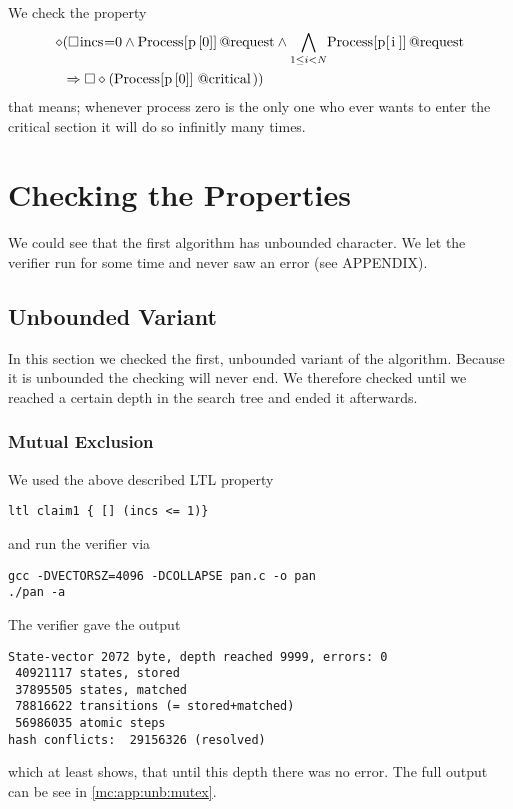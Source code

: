\documentclass{llncs}
\begin{document}
We check the property
\begin{eqnarray}
    \diamond & ( \square \text{\lstinline|incs|=0} \land \text{\lstinline|Process[p[0]]@request|} \land \underset{1\leq i < N}{\bigwedge} \text{\lstinline|Process[p[i]]@request|}\\
    &\Rightarrow \square \diamond(\text{\lstinline|Process[p[0]]@critical|}))
\end{eqnarray}
that means; whenever process zero is the only one who ever wants to enter the critical section it will do so infinitly many times.

\section{Checking the Properties}

We could see that the first algorithm has unbounded character. We let the verifier run for some time
and never saw an error (see APPENDIX).

\subsection{Unbounded Variant}

In this section we checked the first, unbounded variant of the algorithm.
Because it is unbounded the checking will never end. We therefore checked until we reached
a certain depth in the search tree and ended it afterwards.

\subsubsection{Mutual Exclusion}

We used the above described LTL property
\begin{lstlisting}
ltl claim1 { [] (incs <= 1)}
\end{lstlisting}
and run the verifier via
\begin{lstlisting}
gcc -DVECTORSZ=4096 -DCOLLAPSE pan.c -o pan
./pan -a
\end{lstlisting}

The verifier gave the output
\begin{lstlisting}
State-vector 2072 byte, depth reached 9999, errors: 0
 40921117 states, stored
 37895505 states, matched
 78816622 transitions (= stored+matched)
 56986035 atomic steps
hash conflicts:  29156326 (resolved)
\end{lstlisting}
which at least shows, that until this depth there was no error.
The full output can be see in \ref{mc:app:unb:mutex}.
\end{document}
